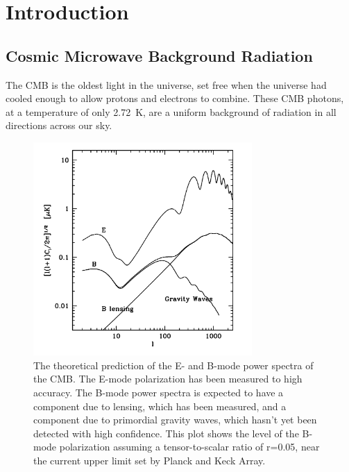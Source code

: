 \chapter{Introduction}
\label{intro_chapter}




\section{Cosmic Microwave Background Radiation}
\label{sec:cmb_science}


The \ac{CMB} is the oldest light in the universe, set free when the universe had cooled enough to allow protons and electrons to combine. 
These \ac{CMB} photons, at a temperature of only 2.72~K, are a uniform background of radiation in all directions across our sky. 

\begin{figure}[htbp]
\begin{center}
\includegraphics[height=3.2in]{figures/predicted_power_spectra.png}
\caption[CMB power spectra]{The theoretical prediction of the E- and B-mode power spectra of the \ac{CMB}. The E-mode polarization has been measured to high accuracy. The B-mode power spectra is expected to have a component due to lensing, which has been measured, and a component due to primordial gravity waves, which hasn't yet been detected with high confidence. This plot shows the level of the B-mode polarization assuming a tensor-to-scalar ratio of r=0.05, near the current upper limit set by Planck and Keck Array. 
\label{fig:cmb_spectra} }
\end{center}
\end{figure}

